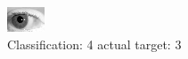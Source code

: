 \begin{figure}[h!]
\begin{center}
\includegraphics[width=0.60\columnwidth]{figures/ID197_class_4_target_3.png}
\end{center}
\caption{ Classification: 4 actual target: 3}
\label{fig:ID197_class_4_target_3}
\end{figure}
